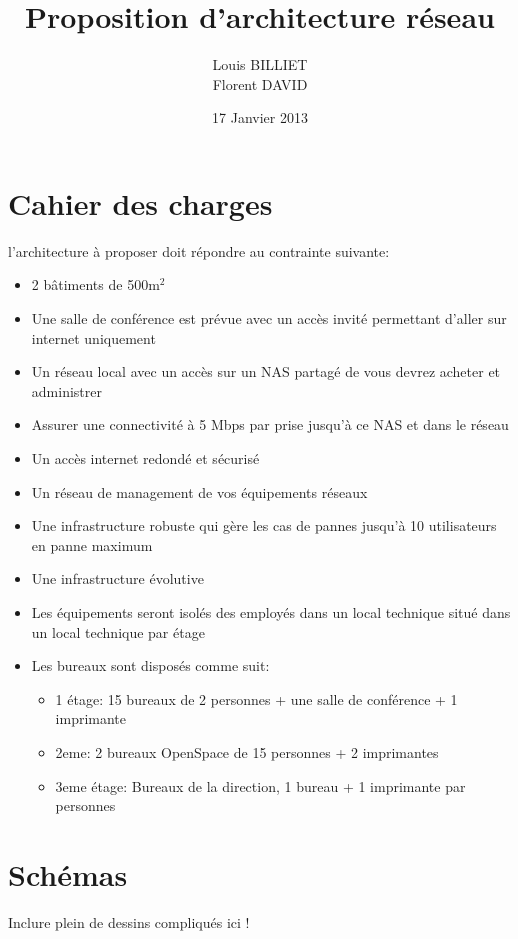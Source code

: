 \documentclass[oneside,10pt]{article}
\begin{document}
\title{Proposition d'architecture r\'eseau}
\author{Louis BILLIET \\ Florent DAVID}
\date{17 Janvier 2013}
\maketitle

\section{Cahier des charges}
l'architecture \`a proposer doit r\'epondre au contrainte suivante:
\begin{itemize}
  \item 2 b\^atiments de 500m$^{2}$
  \item Une salle de conf\'erence est pr\'evue avec un acc\`es invit\'e permettant d'aller sur internet uniquement
  \item Un r\'eseau local avec un acc\`es sur un NAS partag\'e de vous devrez acheter et administrer
  \item Assurer une connectivit\'e \`a 5 Mbps par prise jusqu'\`a ce NAS et dans le r\'eseau
  \item Un acc\`es internet redond\'e et s\'ecuris\'e
  \item Un r\'eseau de management de vos \'equipements r\'eseaux
  \item Une infrastructure robuste qui g\`ere les cas de pannes jusqu'\`a 10 utilisateurs en panne maximum
  \item Une infrastructure \'evolutive
  \item Les \'equipements seront isol\'es des employ\'es dans un local technique situ\'e dans un local technique par \'etage
  \item Les bureaux sont dispos\'es comme suit:
  \begin{itemize}
    \item 1 \'etage: 15 bureaux de 2 personnes + une salle de conf\'erence + 1 imprimante
    \item 2eme: 2 bureaux OpenSpace de 15 personnes + 2 imprimantes
    \item 3eme \'etage: Bureaux de la direction, 1 bureau + 1 imprimante par personnes 
  \end{itemize}
\end{itemize}

\section{Sch\'emas}
Inclure plein de dessins compliqu\'es ici !
\end{document}
